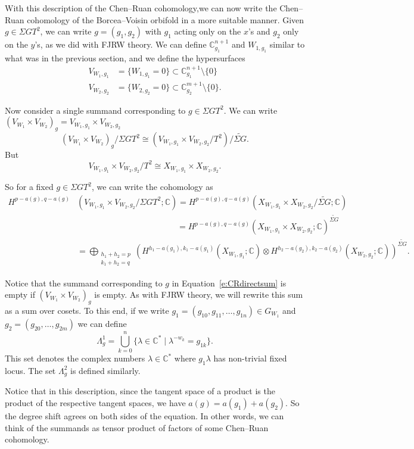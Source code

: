 \documentclass[10pt, letterpaper]{amsart}
\theoremstyle{remark}
\newcommand{\CC}{\mathbb C}
\newcommand{\set}[1]{\{#1\}}
\newcommand{\s}[1]{\Sigma #1}
\begin{document}
With this description of the Chen--Ruan cohomology,we can now write the Chen--Ruan cohomology of the Borcea--Voisin orbifold in a more suitable manner. Given $g\in \s{G}T^2$, we can write $g=(g_1,g_2)$ with $g_1$ acting only on the $x$'s and $g_2$ only on the $y$'s, as we did with FJRW theory. We can define $\CC^{n+1}_{g_1}$ and $W_{1,g_1}$ similar to what was in the previous section, and we define the hypersurfaces
\begin{align*}
V_{W_1,g_1}&=\set{W_{1,g_1}=0}\subset\CC^{n+1}_{g_1}\setminus \set{0}\\
V_{W_2,g_2}&=\set{W_{2,g_2}=0}\subset\CC^{m+1}_{g_2}\setminus \set{0}.
\end{align*}

Now consider a single summand corresponding to $g\in\s{G}T^2$. We can write $(V_{W_1}\times V_{W_2})_g=V_{W_1,g_1}\times V_{W_2,g_2}$
\[
(V_{W_1}\times V_{W_2})_g/\s{G}T^2\cong (V_{W_1,g_1}\times V_{W_2,g_2}/T^2)/\widetilde{\s{G}}.
\]
But 
\[
V_{W_1,g_1}\times V_{W_2,g_2}/T^2\cong X_{W_1,g_1}\times X_{W_2,g_2}.
\]

So for a fixed $g\in \s{G}T^2$, we can write the cohomology as 
\begin{align*}
H^{p-a(g),q-a(g)}&(V_{W_1,g_1}\times V_{W_2,g_2}/\s{G}T^2;\CC) = H^{p-a(g),q-a(g)}(X_{W_1,g_1}\times X_{W_2,g_2}/\widetilde{\s{G}};\CC)\\
	&\qquad\qquad\qquad\qquad\qquad\qquad=H^{p-a(g),q-a(g)}(X_{W_1,g_1}\times X_{W_2,g_2};\CC)^{\widetilde{\s{G}}}\\
	&=\bigoplus_{\substack{h_1+h_2=p\\ k_1+h_2=q}}\left(H^{h_1-a(g_1),k_1-a(g_1)}(X_{W_1,g_1};\CC)\otimes H^{h_2-a(g_2),k_2-a(g_2)}(X_{W_2,g_2};\CC)\right)^{\widetilde{\s{G}}}.
\end{align*}

Notice that the summand corresponding to $g$ in Equation~\eqref{e:CRdirectsum} is empty if $(V_{W_1}\times V_{W_2})_{g}$ is empty. As with FJRW theory, we will rewrite this sum as a sum over cosets. To this end, if we write $g_1=(g_{10},g_{11}, \dots, g_{1n})\in G_{W_1}$ and $g_2=(g_{20}, \dots, g_{2m})$ we can define 
\[
\Lambda^1_{g}=\bigcup_{k=0}^n\set{\lambda\in \CC^*\mid\lambda^{-w_k}=g_{1k}}.
\] 
This set denotes the complex numbers $\lambda\in \CC^*$ where $g_1\lambda$ has non-trivial fixed locus. The set $\Lambda^2_{g}$ is defined similarly. 

Notice that in this description, since the tangent space of a product is the product of the respective tangent spaces, we have $a(g)=a(g_1)+a(g_2)$. So the degree shift agrees on both sides of the equation. In other words, we can think of the summands as tensor product of factors of some Chen--Ruan cohomology. 
\end{document}
